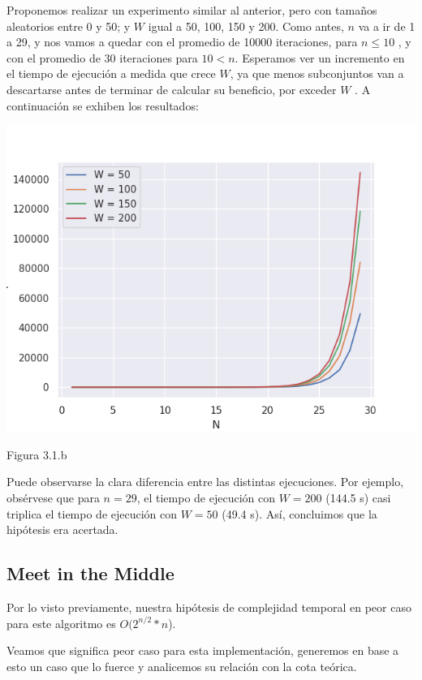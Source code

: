 \documentclass[a4paper]{article}
\begin{document}
Proponemos realizar un experimento similar al anterior, pero con tamaños aleatorios entre 0 y 50; y $W$ igual a 50, 100, 150 y 200. Como antes, $n$ va a ir de 1 a 29, y nos vamos a quedar con el promedio de 10000 iteraciones, para $n \leq 10$ , y con el promedio de 30 iteraciones para $10 <  n $. Esperamos ver un incremento en el tiempo de ejecución a medida que crece $W$, ya que menos subconjuntos van a descartarse antes de terminar de calcular su beneficio, por exceder $W$ . A continuación se exhiben los resultados:

\begin{center}
    \includegraphics[scale=0.8]{4Quesos.png}
    
    
	\caption{Figura 3.1.b  }
  \end{center}


Puede observarse la clara diferencia entre las distintas ejecuciones. Por ejemplo, obsérvese que para $n = 29$, el tiempo de ejecución con $W = 200$ (144.5 s) casi triplica el tiempo de ejecución con $W = 50$ (49.4 s). Así, concluimos que la hipótesis era acertada.





\subsection{Meet in the Middle}

Por lo visto previamente, nuestra hipótesis de complejidad temporal en peor caso para este algoritmo es $O(2^{n/2}*n$).

Veamos que significa peor caso para esta implementación, generemos en base a esto un caso que lo fuerce y analicemos su relación con la cota teórica.
\end{document}
